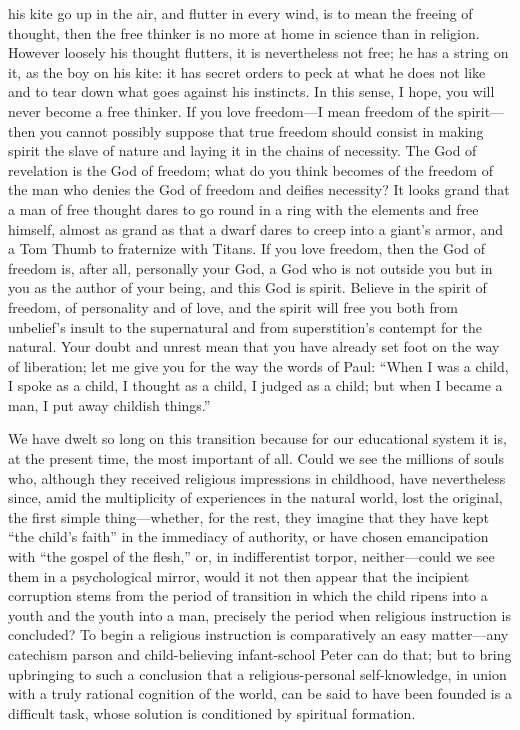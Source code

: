 \documentclass[12pt,a4paper,openany]{book}
\newcommand{\opage}[1]{\marginnote{\footnotesize\textit{[#1]}}}
\begin{document}
his kite go up in the air, and flutter in every wind, is to mean the
freeing of thought, then the free thinker is no more at home in science
than in religion. However loosely his thought flutters, it is
nevertheless not free; he has a string on it, as the boy on his kite: it
has secret orders to peck at what he does not like and to tear down what
goes against his instincts. In this sense, I hope, you will never become
a free thinker. If you love freedom---I mean freedom of the spirit---then
you cannot possibly suppose that true freedom should consist in making
spirit the slave of nature and laying it in the chains of necessity. The
God of revelation is the God of freedom; what do you think becomes of the
freedom of the man who denies the God of freedom and deifies necessity?
It looks grand that a man of free thought dares to go round in a ring
with the elements and free himself, almost as grand as that a dwarf dares
to creep into a giant's armor, and a Tom Thumb to fraternize with
Titans. If you love freedom, then the God of freedom is, after all,
personally your God, a God who is not outside you but in you as the
author of your being, and this God is spirit. Believe in the spirit of
freedom, of personality and of love, and the spirit will free you both
from unbelief's insult to the supernatural and from superstition's
contempt for the natural. Your doubt and unrest mean that you have
already set foot on the way of liberation; let me give you for the way
the words of Paul: ``When I was a child, I spoke as a child, I thought as
a child, I judged as a child; but when I became a man, I put away
childish things.''

We have dwelt so long on this transition because \opage{51}for our educational
system it is, at the present time, the most important of all. Could we
see the millions of souls who, although they received religious
impressions in childhood, have nevertheless since, amid the multiplicity
of experiences in the natural world, lost the original, the first simple
thing---whether, for the rest, they imagine that they have kept ``the
child's faith'' in the immediacy of authority, or have chosen
emancipation with ``the gospel of the flesh,'' or, in indifferentist
torpor, neither---could we see them in a psychological mirror, would it
not then appear that the incipient corruption stems from the period of
transition in which the child ripens into a youth and the youth into a
man, precisely the period when religious instruction is concluded? To
begin a religious instruction %
is comparatively an easy matter---any catechism parson and child-believing
infant-school Peter can do that; but to bring upbringing to such a
conclusion that a religious-personal self-knowledge, in union with a
truly rational cognition of the world, can be said to have been founded
is a difficult task, whose solution is conditioned by spiritual
formation.
\end{document}
